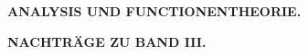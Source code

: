 \clearpage
{}

\vspace*{4cm}
\begin{center}
\textbf{\Large ANALYSIS UND FUNCTIONENTHEORIE.}

\vspace{1em}
\textbf{NACHTRÄGE ZU BAND III.}
\end{center}
\clearpage
